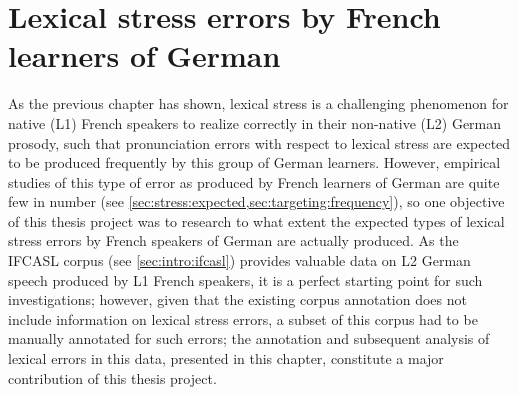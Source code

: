 
%
%
\chapter{Lexical stress errors by French learners of German}
\label{chap:lexstress}



%	
	

	
	As the previous chapter has shown, lexical stress is a challenging phenomenon for native (L1) French speakers to realize correctly in their non-native (L2) German prosody, such that pronunciation errors with respect to lexical stress are expected to be produced frequently by this group of German learners.
%
	However, empirical studies of this type of error as produced by French learners of German are quite few in number (see \cref{sec:stress:expected,sec:targeting:frequency}), so one objective of this thesis project was to research to what extent the expected types of lexical stress errors by French speakers of German are actually produced.
	 As the IFCASL corpus (see \cref{sec:intro:ifcasl}) provides valuable data on L2 German speech produced by L1 French speakers, it is a perfect starting point for such investigations; however, given that the existing corpus annotation does not include information on lexical stress errors,
	  a subset of this corpus had to be manually annotated for such errors; the annotation and subsequent analysis of lexical errors in this data, presented in this chapter, constitute a major contribution of this thesis project.
%
	
